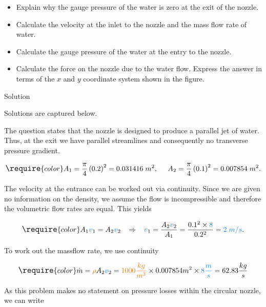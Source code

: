 \documentclass[
  1.2em,
  letterpaper,
  DIV=11,
  numbers=noendperiod]{scrartcl}
\providecommand{\tightlist}{%
  \setlength{\itemsep}{0pt}\setlength{\parskip}{0pt}}\usepackage{longtable,booktabs,array}
\begin{document}
\begin{itemize}
\tightlist
\item
  Explain why the gauge pressure of the water is zero at the exit of the
  nozzle.
\item
  Calculate the velocity at the inlet to the nozzle and the mass flow
  rate of water.
\item
  Calculate the gauge pressure of the water at the entry to the nozzle.
\item
  Calculate the force on the nozzle due to the water flow. Express the
  answer in terms of the \(x\) and \(y\) coordinate system shown in the
  figure.
\end{itemize}

Solution

Solutions are captured below.

The question states that the nozzle is designed to produce a parallel
jet of water. Thus, at the exit we have parallel streamlines and
consequently no transverse pressure gradient.

\[
\large
\require{color}
A_1 = \frac{\pi }{4} \left(0.2\right)^2 = 0.031416 \; m^2, \; \; \; \; \; A_2 = \frac{\pi}{4} \left( 0.1 \right)^2 = 0.007854 \; m^2.
\]

The velocity at the entrance can be worked out via continuity. Since we
are given no information on the density, we assume the flow is
incompressible and therefore the volumetric flow rates are equal. This
yields

\[
\large
\require{color}
A_1 {\color[rgb]{0.059472,0.501943,0.998465}v}_1 = A_2 {\color[rgb]{0.059472,0.501943,0.998465}v}_2  \; \; \; \Rightarrow \; \; \; {\color[rgb]{0.059472,0.501943,0.998465}v}_1 = \frac{A_2 {\color[rgb]{0.059472,0.501943,0.998465}v}_2}{A_1} = \frac{0.1^2 \times {\color[rgb]{0.059472,0.501943,0.998465}8}}{0.2^2} = {\color[rgb]{0.059472,0.501943,0.998465}2 \; m/s}.
\]

To work out the massflow rate, we use continuity

\[
\large
\require{color}
\dot{m} = {\color[rgb]{0.918231,0.469102,0.038229}\rho} A_2 {\color[rgb]{0.059472,0.501943,0.998465}v}_2 = {\color[rgb]{0.918231,0.469102,0.038229}1000} {\color[rgb]{0.918231,0.469102,0.038229} \frac{kg}{m^3}} \times 0.007854 m^2 \times {\color[rgb]{0.059472,0.501943,0.998465}8} {\color[rgb]{0.059472,0.501943,0.998465} \frac{m}{s}} = 62.83 \frac{kg}{s}
\]

As this problem makes no statement on pressure losses within the
circular nozzle, we can write
\end{document}
